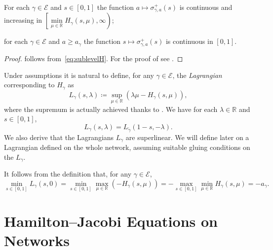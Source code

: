 \documentclass[11pt,a4paper,american]{article}
\newcommand{\Ecal}{\mathcal E}
\newcommand{\Rds}{\mathds R}
\begin{document}
    \begin{prop}\label{sigcont}\leavevmode
        \begin{myenum}
            \item\label{en:sigcont1} For each $\gamma\in\Ecal$ and $s\in[0,1]$ the function $a\mapsto\sigma_{\gamma,a}^+(s)$ is continuous and increasing in $\left[\min\limits_{\mu\in\Rds}H_\gamma(s,\mu),\infty\right)$;
            \item\label{en:sigcont2} for each $\gamma\in\Ecal$ and $a\ge a_\gamma$ the function $s\mapsto\sigma_{\gamma,a}^+(s)$ is continuous in $[0,1]$.
        \end{myenum}
    \end{prop}
    \begin{proof}
         follows from~\cref{eq:sublevelH}. For the proof of  see \cite[Proposition 5.1]{SiconolfiSorrentino18}.
    \end{proof}

    Under assumptions  it is natural to define, for any $\gamma\in\Ecal$, the \emph{Lagrangian} corresponding to $H_\gamma$ as
    \begin{equation*}
        L_\gamma(s,\lambda)\coloneqq\sup_{\mu\in\Rds}(\lambda\mu-H_\gamma(s,\mu)),
    \end{equation*}
    where the supremum is actually achieved thanks to . We have for each $\lambda\in\Rds$ and $s\in[0,1]$,
    \begin{equation}\label{eq:lagcomp}
        L_\gamma(s,\lambda)=L_{\widetilde\gamma}(1-s,-\lambda).
    \end{equation}
    We also derive that the Lagrangians $L_\gamma$ are superlinear. We will define later on a Lagrangian defined on the whole network, assuming suitable gluing conditions on the $L_\gamma$.

    It follows from the definition that, for any $\gamma\in\Ecal$,
    \begin{equation}\label{eq:loclagmin}
        \min_{s\in[0,1]}L_\gamma(s,0)=\min_{s\in[0,1]}\max_{\mu\in\Rds}(-H_\gamma(s,\mu))=-\max_{s\in[0,1]}\min_{\mu\in\Rds}H_\gamma(s,\mu)=-a_\gamma.
    \end{equation}

    \section{Hamilton--Jacobi Equations on Networks}\label{HJsec}
\end{document}
